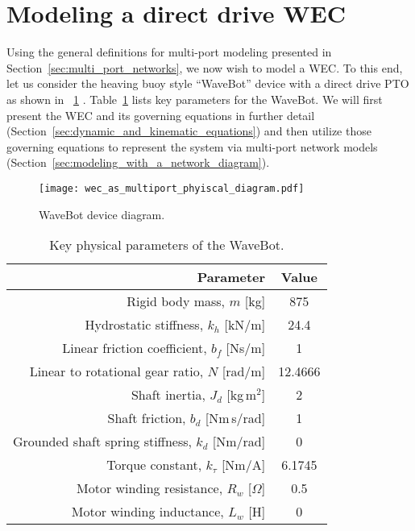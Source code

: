 \documentclass[5p,times]{elsarticle}
\begin{document}
\section{Modeling a direct drive WEC}\label{sec:modeling_a_direct_drive_wec}
Using the general definitions for multi-port modeling presented in Section~\ref{sec:multi_port_networks}, we now wish to model a WEC.
To this end, let us consider the heaving buoy style ``WaveBot'' device with a direct drive PTO as shown in \figurename~\ref{fig:wec_as_multiport_physical_diagram} \cite{Forbush:2024aa}.
Table~\ref{tab:wec_physical_params} lists key parameters for the WaveBot.
We will first present the WEC and its governing equations in further detail (Section~\ref{sec:dynamic_and_kinematic_equations}) and then utilize those governing equations to represent the system via multi-port network models (Section~\ref{sec:modeling_with_a_network_diagram}).

\begin{figure}[tb]
        \centering
        \texttt{[image: wec\_as\_multiport\_phyiscal\_diagram.pdf]}
        \caption{WaveBot device diagram.}
        \label{fig:wec_as_multiport_physical_diagram}
\end{figure}

\begin{table}[tb]
        \caption{Key physical parameters of the WaveBot.}
        \label{tab:wec_physical_params}
        \centering

        \begin{tabular}{rc}
        \hline

        \hline
        \textbf{Parameter} & \textbf{Value} \\
        \hline
        Rigid body mass, $m$ [kg]                       & 875 \\
        Hydrostatic stiffness, $k_h$ [kN/m]             & 24.4 \\
        Linear friction coefficient, $b_f$ [Ns/m]       & 1 \\ %
        Linear to rotational gear ratio, $N$ [rad/m]    & 12.4666 \\
        Shaft inertia, $J_d$ [kg\,m$^2$]                & 2 \\ %
        Shaft friction, $b_d$ [Nm\,s/rad]               & 1 \\ %
        Grounded shaft spring stiffness, $k_d$ [Nm/rad] & 0 \\ %
        Torque constant, $k_\tau$ [Nm/A]                & 6.1745 \\
        Motor winding resistance, $R_w$ [$\Omega$]      & 0.5 \\
        Motor winding inductance, $L_w$ [H]             & 0 \\
        \hline

        \hline
        \end{tabular}
\end{table}
\end{document}
